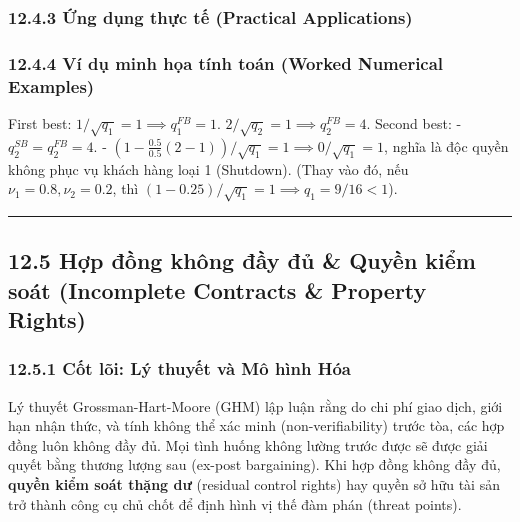 \documentclass[
]{article}
\begin{document}
\subsubsection{12.4.3 Ứng dụng thực tế (Practical
Applications)}\label{ux1ee9ng-dux1ee5ng-thux1ef1c-tux1ebf-practical-applications-43}

\subsubsection{12.4.4 Ví dụ minh họa tính toán (Worked Numerical
Examples)}\label{vuxed-dux1ee5-minh-hux1ecda-tuxednh-touxe1n-worked-numerical-examples-35}

First best: \(1 / \sqrt{q_1} = 1 \implies q_1^{FB} = 1\).
\(2 / \sqrt{q_2} = 1 \implies q_2^{FB} = 4\). Second best: -
\(q_2^{SB} = q_2^{FB} = 4\). -
\(\left(1 - \frac{0.5}{0.5}(2 - 1)\right) / \sqrt{q_1} = 1 \implies 0 / \sqrt{q_1} = 1\),
nghĩa là độc quyền không phục vụ khách hàng loại 1 (Shutdown). (Thay vào
đó, nếu \(\nu_1 = 0.8, \nu_2 = 0.2\), thì
\(\left(1 - 0.25\right) / \sqrt{q_1} = 1 \implies q_1 = 9/16 < 1\)).

\begin{center}\rule{0.5\linewidth}{0.5pt}\end{center}

\subsection{12.5 Hợp đồng không đầy đủ \& Quyền kiểm soát (Incomplete
Contracts \& Property
Rights)}\label{hux1ee3p-ux111ux1ed3ng-khuxf4ng-ux111ux1ea7y-ux111ux1ee7-quyux1ec1n-kiux1ec3m-souxe1t-incomplete-contracts-property-rights}

\subsubsection{12.5.1 Cốt lõi: Lý thuyết và Mô hình
Hóa}\label{cux1ed1t-luxf5i-luxfd-thuyux1ebft-vuxe0-muxf4-huxecnh-huxf3a-4}

Lý thuyết Grossman-Hart-Moore (GHM) lập luận rằng do chi phí giao dịch,
giới hạn nhận thức, và tính không thể xác minh (non-verifiability) trước
tòa, các hợp đồng luôn không đầy đủ. Mọi tình huống không lường trước
được sẽ được giải quyết bằng thương lượng sau (ex-post bargaining). Khi
hợp đồng không đầy đủ, \textbf{quyền kiểm soát thặng dư} (residual
control rights) hay quyền sở hữu tài sản trở thành công cụ chủ chốt để
định hình vị thế đàm phán (threat points).
\end{document}
